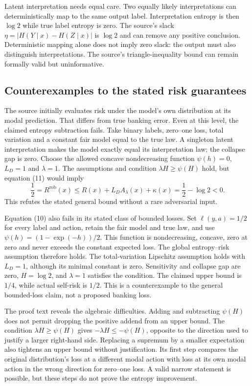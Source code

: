 Latent interpretation needs equal care. Two equally likely interpretations
can deterministically map to the same output label. Interpretation entropy
is then $\log2$ while true label entropy is zero. The source's slack
$\eta=|H(Y\mid x)-H(Z\mid x)|$ is $\log2$ and can remove any positive
conclusion. Deterministic mapping alone does not imply zero slack: the output
must also distinguish interpretations. The source's triangle-inequality bound
can remain formally valid but uninformative.
\citep{exec23_sua_original,exec23_sua_counterexamples}

\subsection{Counterexamples to the stated risk guarantees}
\label{eq:exec23-sua-counterexample}
The source initially evaluates risk under the model's own distribution at its
modal prediction. That differs from true banking error. Even at this level,
the claimed entropy subtraction fails. Take binary labels, zero--one loss,
total variation and a constant fair model equal to the true law. A singleton
latent interpretation makes the model exactly equal its interpretation law;
the collapse gap is zero. Choose the allowed concave nondecreasing function
$\psi(h)=0$, $L_D=1$ and $\lambda=1$. The assumptions and condition
$\lambda H\geq\psi(H)$ hold, but equation (11) would imply
\[
 \frac12=R^{\mathrm{rob}}(x)
 \leq R(x)+L_D A_\lambda(x)+\kappa(x)
 =\frac12-\log2<0.
\]
This refutes the stated general bound without a rare adversarial input.
\citep{exec23_sua_original,exec23_sua_counterexamples}

Equation (10) also fails in its stated class of bounded losses. Set
$\ell(y,a)=1/2$ for every label and action, retain the fair model and true
law, and use $\psi(h)=(1-\exp(-h))/2$. This function is nondecreasing,
concave, zero at zero and never exceeds the constant expected loss. The
global entropy--risk assumption therefore holds. The total-variation
Lipschitz assumption holds with $L_D=1$, although its minimal constant is
zero. Sensitivity and collapse gap are zero, $H=\log2$, and $\lambda=1$
satisfies the condition. The claimed upper bound is $1/4$, while actual
self-risk is $1/2$. This is a counterexample to the general bounded-loss
claim, not a proposed banking loss. \citep{exec23_sua_counterexamples}

The proof text reveals the algebraic difficulties. Adding and subtracting
$\psi(H)$ does not permit dropping the positive addend from an upper bound.
The condition $\lambda H\geq\psi(H)$ gives
$-\lambda H\leq-\psi(H)$, opposite to the direction used to justify a
larger right-hand side. Replacing a supremum by a smaller expectation also
tightens an upper bound without justification. Its first step compares the
original distribution's loss at a different modal action with loss at its own
modal action in the wrong direction for zero--one loss. A valid narrow
statement is possible, but these steps do not prove the entropy improvement.
\citep{exec23_sua_original}

